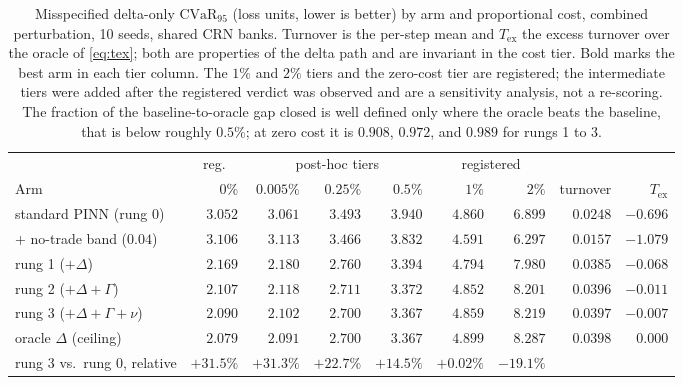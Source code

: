 \documentclass[10pt]{article}
\begin{document}
\begin{table}[!htbp]
\centering\footnotesize\setlength{\tabcolsep}{4.5pt}
\begin{tabular}{@{}lrrrrrrrr@{}}
\toprule
& \multicolumn{1}{c}{reg.} & \multicolumn{3}{c}{post-hoc tiers} & \multicolumn{2}{c}{registered} & & \\
\cmidrule(lr){2-2}\cmidrule(lr){3-5}\cmidrule(lr){6-7}
Arm & $0\%$ & $0.005\%$ & $0.25\%$ & $0.5\%$ & $1\%$ & $2\%$ & turnover & $T_{\mathrm{ex}}$ \\
\midrule
standard PINN (rung 0) & $3.052$ & $3.061$ & $3.493$ & $3.940$ & $4.860$ & $6.899$ & $0.0248$ & $-0.696$ \\
\quad + no-trade band ($0.04$) & $3.106$ & $3.113$ & $3.466$ & $3.832$ & $\mathbf{4.591}$ & $\mathbf{6.297}$ & $0.0157$ & $-1.079$ \\
rung 1 ($+\Delta$) & $2.169$ & $2.180$ & $2.760$ & $3.394$ & $4.794$ & $7.980$ & $0.0385$ & $-0.068$ \\
rung 2 ($+\Delta{+}\Gamma$) & $2.107$ & $2.118$ & $2.711$ & $3.372$ & $4.852$ & $8.201$ & $0.0396$ & $-0.011$ \\
rung 3 ($+\Delta{+}\Gamma{+}\nu$) & $2.090$ & $2.102$ & $2.700$ & $3.367$ & $4.859$ & $8.219$ & $0.0397$ & $-0.007$ \\
oracle $\Delta$ (ceiling) & $\mathbf{2.079}$ & $\mathbf{2.091}$ & $\mathbf{2.700}$ & $\mathbf{3.367}$ & $4.899$ & $8.287$ & $0.0398$ & $0.000$ \\
\midrule
rung 3 vs.\ rung 0, relative & $+31.5\%$ & $+31.3\%$ & $+22.7\%$ & $+14.5\%$ & $+0.02\%$ & $-19.1\%$ & & \\
\bottomrule
\end{tabular}
\caption{Misspecified delta-only $\mathrm{CVaR}_{95}$ (loss units, lower is
better) by arm and proportional cost, combined perturbation, 10 seeds, shared CRN
banks. Turnover is the per-step mean and $T_{\mathrm{ex}}$ the excess turnover over
the oracle of \eqref{eq:tex}; both are properties of the delta path and are
invariant in the cost tier. Bold marks the best arm in each tier column. The $1\%$ and $2\%$ tiers and the
zero-cost tier are registered; the intermediate tiers were added after the
registered verdict was observed and are a sensitivity analysis, not a re-scoring.
The fraction of the baseline-to-oracle gap closed is well defined only where the
oracle beats the baseline, that is below roughly $0.5\%$; at zero cost it is
$0.908$, $0.972$, and $0.989$ for rungs 1 to 3.}
\label{tab:tiers}
\end{table}
\end{document}
